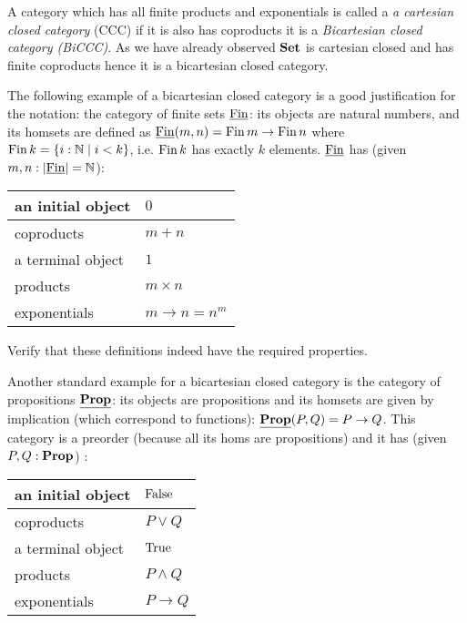 A category which has all finite products and exponentials is called a \emph{a cartesian closed category} (CCC) if it is also has coproducts it is a \emph{Bicartesian closed category (BiCCC)}. As we have already observed $\mathbf{Set}$ is cartesian closed and has finite coproducts hence it is a bicartesian closed category. 

The following example of a bicartesian closed category is a good justification for the notation: the category of finite sets $\underline{\mathbf{\mathrm{Fin}}}$: its objects are natural numbers, and its homsets are defined as $\underline{\mathbf{\mathrm{Fin}}}(m,n) = \mathrm{Fin}\, m \to \mathrm{Fin}\,n$ where $\mathrm{Fin}\,k = \{ i : \mathbb{N} \mid i < k\}$, i.e. $\mathrm{Fin}\,k$ has exactly $k$ elements. $\underline{\mathbf{\mathrm{Fin}}}$ has (given $m,n : |\underline{\mathbf{\mathrm{Fin}}}|=\mathbb{N}$):

\begin{tabular}{|l|l|}
\hline
an initial object & $0$ \\ \hline
coproducts & $m + n$ \\ \hline
a terminal object & $1$ \\\hline
products & $m\times n$ \\\hline
exponentials & $m \to n = n^m$\\\hline
\end{tabular}


\begin{Exercise}
Verify that these definitions indeed have the required properties.
\end{Exercise}

Another standard example for a bicartesian closed category is the category of propositions $\underline{\mathbf{\mathbf{Prop}}}$: its objects are propositions and its homsets are given by implication (which correspond to functions): $\underline{\mathbf{\mathbf{Prop}}}(P,Q) = P \to Q$. This category is a preorder (because all its homs are propositions) and it has (given $P,Q : \mathbf{Prop}$) :

\begin{tabular}{|l|l|}
\hline
an initial object & $\mathrm{False}$ \\\hline
coproducts & $P \vee Q$ \\ \hline
a terminal object & $\mathrm{True}$ \\\hline
products & $P \wedge Q$ \\\hline
exponentials & $P \to Q$\\\hline
\end{tabular}

